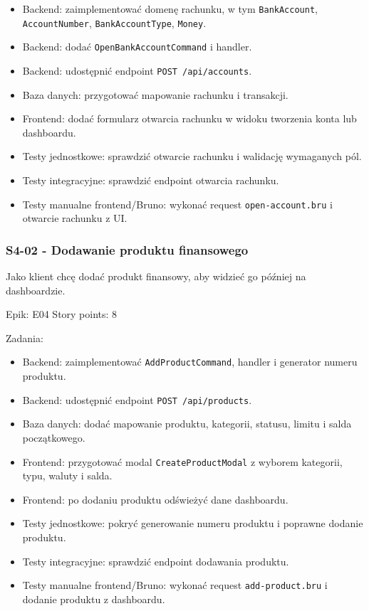 \documentclass[12pt,a4paper]{article}
\begin{document}
\begin{itemize}
\item Backend: zaimplementować domenę rachunku, w tym \texttt{BankAccount}, \texttt{AccountNumber}, \texttt{BankAccountType}, \texttt{Money}.
\item Backend: dodać \texttt{OpenBankAccountCommand} i handler.
\item Backend: udostępnić endpoint \texttt{POST /api/accounts}.
\item Baza danych: przygotować mapowanie rachunku i transakcji.
\item Frontend: dodać formularz otwarcia rachunku w widoku tworzenia konta lub dashboardu.
\item Testy jednostkowe: sprawdzić otwarcie rachunku i walidację wymaganych pól.
\item Testy integracyjne: sprawdzić endpoint otwarcia rachunku.
\item Testy manualne frontend/Bruno: wykonać request \texttt{open-account.bru} i otwarcie rachunku z UI.
\end{itemize}

\subsubsection*{S4-02 - Dodawanie produktu finansowego}

Jako klient chcę dodać produkt finansowy, aby widzieć go później na dashboardzie.

Epik: E04
Story points: 8

Zadania:

\begin{itemize}
\item Backend: zaimplementować \texttt{AddProductCommand}, handler i generator numeru produktu.
\item Backend: udostępnić endpoint \texttt{POST /api/products}.
\item Baza danych: dodać mapowanie produktu, kategorii, statusu, limitu i salda początkowego.
\item Frontend: przygotować modal \texttt{CreateProductModal} z wyborem kategorii, typu, waluty i salda.
\item Frontend: po dodaniu produktu odświeżyć dane dashboardu.
\item Testy jednostkowe: pokryć generowanie numeru produktu i poprawne dodanie produktu.
\item Testy integracyjne: sprawdzić endpoint dodawania produktu.
\item Testy manualne frontend/Bruno: wykonać request \texttt{add-product.bru} i dodanie produktu z dashboardu.
\end{itemize}
\end{document}
